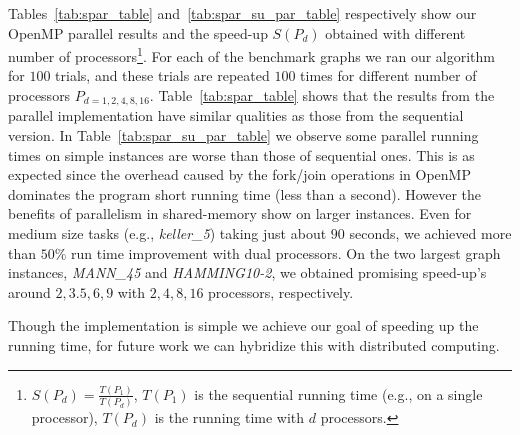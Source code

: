 \documentclass[11pt]{article}
\begin{document}
Tables~\ref{tab:spar_table} and~\ref{tab:spar_su_par_table} respectively show our OpenMP parallel results and the speed-up $S(P_d)$ obtained with different number of processors\footnote{$S(P_d) = \frac{T(P_1)}{T(P_d)}$, $T(P_1)$ is the sequential running time (e.g., on a single processor), $T(P_d)$ is the running time with $d$ processors.}. For each of the benchmark graphs we ran our algorithm for $100$ trials, and these trials are repeated $100$ times for different number of processors $P_{d=1,2,4,8,16}$.  Table~\ref{tab:spar_table} shows that the results from the parallel implementation have similar qualities as those from the sequential version.  In Table~\ref{tab:spar_su_par_table} we observe some parallel running times on simple instances are worse than those of sequential ones. This is as expected since the overhead caused by the fork/join operations in OpenMP dominates the program short running time (less than a second).  However the benefits of parallelism in shared-memory show on larger instances.  Even for medium size tasks (e.g., \textit{keller\_5}) taking just about $90$ seconds, we achieved more than $50\%$ run time improvement with dual processors.  On the two largest graph instances, \textit{MANN\_45} and \textit{HAMMING10-2}, we obtained promising speed-up's around $2, 3.5, 6, 9$ with $2,4,8,16$ processors, respectively.


Though the implementation is simple we achieve our goal of speeding up the running time, for future work we can hybridize this with distributed computing.  %
\end{document}
